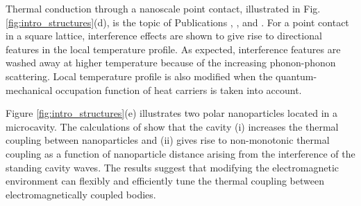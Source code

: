 Thermal conduction through a nanoscale point contact, illustrated in Fig. \ref{fig:intro_structures}(d), is the topic of Publications , , and . For a point contact in a square lattice, interference effects are shown to give rise to directional features in the local temperature profile. As expected, interference features are washed away at higher temperature because of the increasing phonon-phonon scattering. Local temperature profile is also modified when the quantum-mechanical occupation function of heat carriers is taken into account. 

Figure \ref{fig:intro_structures}(e) illustrates two polar nanoparticles located in a microcavity. The calculations of  show that the cavity (i) increases the thermal coupling between nanoparticles and (ii) gives rise to non-monotonic thermal coupling as a function of nanoparticle distance arising from the interference of the standing cavity waves. The results suggest that modifying the electromagnetic environment can flexibly and efficiently tune the thermal coupling between electromagnetically coupled bodies.








